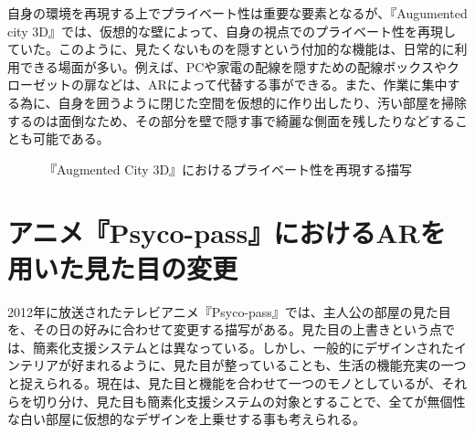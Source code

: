 自身の環境を再現する上でプライベート性は重要な要素となるが、『Augumented city 3D』では、仮想的な壁によって、自身の視点でのプライベート性を再現していた。このように、見たくないものを隠すという付加的な機能は、日常的に利用できる場面が多い。例えば、PCや家電の配線を隠すための配線ボックスやクローゼットの扉などは、ARによって代替する事ができる。また、作業に集中する為に、自身を囲うように閉じた空間を仮想的に作り出したり、汚い部屋を掃除するのは面倒なため、その部分を壁で隠す事で綺麗な側面を残したりなどすることも可能である。

\begin{figure}[htbp]
  \begin{minipage}{0.5\hsize}
    \begin{center}
    \end{center}
  \end{minipage}
  \begin{minipage}{0.5\hsize}
    \begin{center}
    \end{center}
  \end{minipage}
  \caption{『Augmented City 3D』におけるプライベート性を再現する描写}
\end{figure}


\section{アニメ『Psyco-pass』におけるARを用いた見た目の変更}

2012年に放送されたテレビアニメ『Psyco-pass』\cite{psycopass}では、主人公の部屋の見た目を、その日の好みに合わせて変更する描写がある。見た目の上書きという点では、簡素化支援システムとは異なっている。しかし、一般的にデザインされたインテリアが好まれるように、見た目が整っていることも、生活の機能充実の一つと捉えられる。現在は、見た目と機能を合わせて一つのモノとしているが、それらを切り分け、見た目も簡素化支援システムの対象とすることで、全てが無個性な白い部屋に仮想的なデザインを上乗せする事も考えられる。

